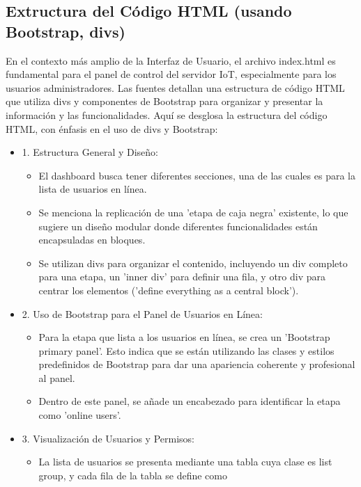 \documentclass{report}
\begin{document}
\subsection{Extructura del Código HTML (usando Bootstrap, divs)}
En el contexto más amplio de la Interfaz de Usuario, el archivo index.html es fundamental para el panel de control del servidor IoT, 
especialmente para los usuarios administradores. Las fuentes detallan una estructura de código HTML que utiliza divs y componentes de 
Bootstrap para organizar y presentar la información y las funcionalidades.
Aquí se desglosa la estructura del código HTML, con énfasis en el uso de divs y Bootstrap:
\begin{itemize}
    \item 1. Estructura General y Diseño:
        \begin{itemize}
            \item El dashboard busca tener diferentes secciones, una de las cuales es para la lista de usuarios en línea.
            \item Se menciona la replicación de una 'etapa de caja negra' existente, lo que sugiere un diseño modular donde diferentes 
            funcionalidades están encapsuladas en bloques.
            \item Se utilizan divs para organizar el contenido, incluyendo un div completo para una etapa, un 'inner div' para definir 
            una fila, y otro div para centrar los elementos ('define everything as a central block').
        \end{itemize}
    \item 2. Uso de Bootstrap para el Panel de Usuarios en Línea:
        \begin{itemize}
            \item Para la etapa que lista a los usuarios en línea, se crea un 'Bootstrap primary panel'. Esto indica que se están 
            utilizando las clases y estilos predefinidos de Bootstrap para dar una apariencia coherente y profesional al panel.
            \item Dentro de este panel, se añade un encabezado para identificar la etapa como 'online users'.
        \end{itemize}
    \item 3. Visualización de Usuarios y Permisos:
        \begin{itemize}
            \item La lista de usuarios se presenta mediante una tabla cuya clase es list group, y cada fila de la tabla se define como 

\end{itemize}
\end{itemize}
\end{document}
